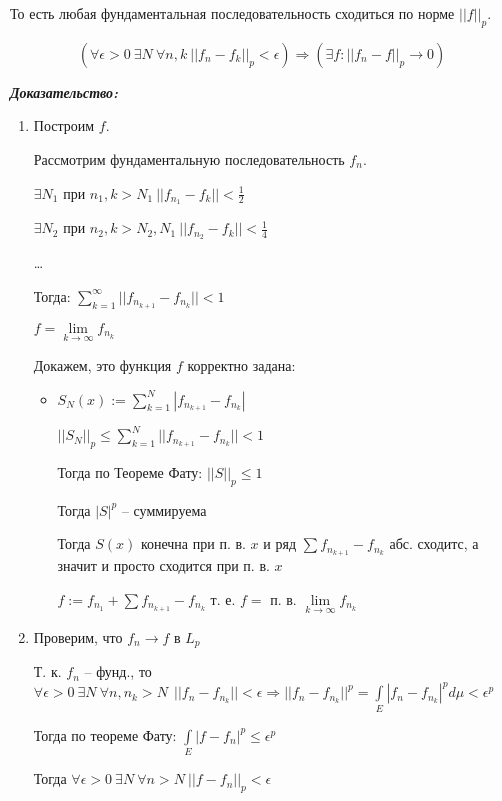 \documentclass[paper=a4, fontsize=17pt]{article}
\begin{document}
То есть любая фундаментальная последовательность сходиться по норме $ ||f||_p $.

$$(\forall \epsilon > 0 ~ \exists N ~ \forall n, k ~ ||f_n - f_k||_p < \epsilon) \Rightarrow (\exists f : ||f_n - f||_p \rightarrow 0)$$


\textbf{\emph{Доказательство:}}

\begin{enumerate}
	\item Построим $ f $.

	Рассмотрим фундаментальную последовательность $ f_n $.

	$ \exists N_1 $ при $ n_1, k > N_1 ~ ||f_{n_1} - f_k|| < \frac{1}{2}$

	$ \exists N_2 $ при $ n_2, k > N_2, N_1 ~ ||f_{n_2} - f_k|| < \frac{1}{4}$

	\dots

	Тогда: $ \sum_{k = 1}^{\infty} || f_{n_{k+1}} - f_{n_k} || < 1$

	$ f = \lim\limits_{k \rightarrow \infty} f_{n_k}$

	Докажем, это функция $ f $ корректно задана:
	\begin{itemize}
		\item
		$ S_N (x) := \sum_{k = 1}^{N}|f_{n_{k+1}} - f_{n_k}|$

		$ ||S_N||_p \leq \sum_{k = 1}^{N} || f_{n_{k+1}} - f_{n_k} || < 1$

		Тогда по Теореме Фату: $ ||S||_p \leq 1 $

		Тогда $ |S|^p $ -- суммируема

		Тогда $ S(x) $ конечна при п. в. $ x $  и ряд $ \sum f_{n_{k + 1}} - f_{n_k} $ абс. сходитс, а значит и просто сходится при п. в. $ x $

		$ f:= f_{n_1} +  \sum f_{n_{k + 1}} - f_{n_k} $ т. е. $ f = $ п. в. $ \lim\limits_{k \rightarrow \infty} f_{n_k} $
	\end{itemize}

	\item Проверим, что $ f_n \rightarrow f $ в $ L_p $

	Т. к. $ f_n $ -- фунд., то $ \forall \epsilon > 0 ~ \exists N ~ \forall n, n_k > N ~ ~ ||f_n - f_{n_k} || < \epsilon \Rightarrow
	|| f_n  - f_{n_k} ||^p  = \int\limits_{E} |f_n  - f_{n_k}|^p d\mu < \epsilon^p $

	Тогда по теореме Фату: $ \int\limits_{E} |f - f_n|^p \leq \epsilon^p$

	Тогда $ \forall \epsilon > 0 ~ \exists N ~ \forall n > N ~ || f - f_n ||_p < \epsilon $


\end{enumerate}
\end{document}
